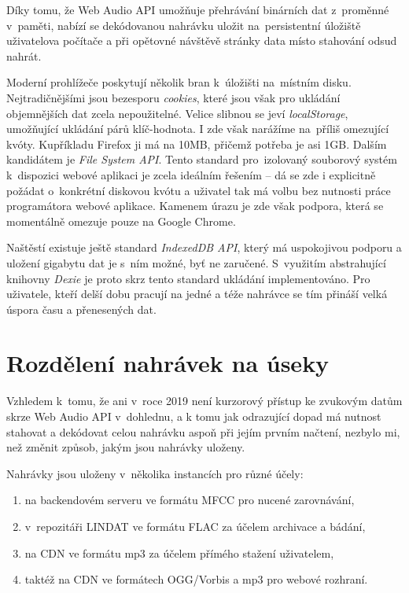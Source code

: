 Díky tomu, že Web Audio API umožňuje přehrávání binárních dat z~proměnné
v~paměti, nabízí se dekódovanou nahrávku uložit na~persistentní úložiště
uživatelova počítače a při opětovné návštěvě stránky data místo stahování odsud
nahrát.

Moderní prohlížeče poskytují několik bran k~úložišti na~místním disku.
Nejtradičnějšími jsou bezesporu \textit{cookies}, které jsou však pro ukládání
objemnějších dat zcela nepoužitelné. Velice slibnou se jeví
\textit{localStorage}, umožňující ukládání párů klíč-hodnota. I zde však
narážíme na~příliš omezující kvóty. Kupříkladu Firefox ji má na 10MB, přičemž
potřeba je asi 1GB. Dalším kandidátem je \textit{File System API}. Tento
standard pro~izolovaný souborový systém k~dispozici webové aplikaci je zcela
ideálním řešením -- dá se zde i explicitně požádat o~konkrétní diskovou kvótu a
uživatel tak má volbu bez nutnosti práce programátora webové aplikace. Kamenem
úrazu je zde však podpora, která se momentálně omezuje pouze na Google Chrome.

Naštěstí existuje ještě standard \textit{IndexedDB API}, který má uspokojivou
podporu a uložení gigabytu dat je s~ním možné, byť ne zaručené. S~využitím
abstrahující knihovny \textit{Dexie} je proto skrz tento standard ukládání
implementováno. Pro uživatele, kteří delší dobu pracují na jedné a téže nahrávce
se tím přináší velká úspora času a přenesených dat.

\section{Rozdělení nahrávek na úseky}

Vzhledem k~tomu, že ani v~roce 2019 není kurzorový přístup ke zvukovým datům
skrze Web Audio API v~dohlednu, a k tomu jak odrazující dopad má nutnost
stahovat a dekódovat celou nahrávku aspoň při jejím prvním načtení, nezbylo mi,
než změnit způsob, jakým jsou nahrávky uloženy.

Nahrávky jsou uloženy v~několika instancích pro různé účely:

\begin{enumerate}
\item{na backendovém serveru ve formátu MFCC pro nucené zarovnávání,}
\item{v~repozitáři LINDAT ve formátu FLAC za účelem archivace a bádání,}
\item{na CDN ve formátu mp3 za účelem přímého stažení uživatelem,}
\item{taktéž na CDN ve formátech OGG/Vorbis a mp3 pro webové rozhraní.}
\end{enumerate}

